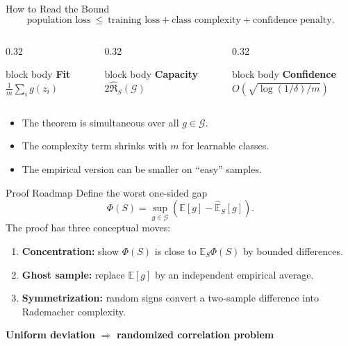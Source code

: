 \documentclass[aspectratio=169,10pt]{beamer}
\newcommand{\Gc}{\mathcal{G}}
\newcommand{\RadS}{\widehat{\mathfrak{R}}_S}
\newcommand{\E}{\mathbb{E}}
\newcommand{\KeyBox}[1]{%
  \begin{beamercolorbox}[rounded=true,sep=0.22cm,wd=\linewidth]{block body}
    #1
  \end{beamercolorbox}%
}
\begin{document}
\begin{frame}[t]{How to Read the Bound}
  \vspace{0.10cm}
  \[
    \text{population loss}
    \ \le\ \text{training loss}
    +\text{class complexity}
    +\text{confidence penalty}.
  \]
  \vspace{0.10cm}
  \begin{columns}[T,totalwidth=\textwidth]
    \begin{column}{0.32\textwidth}
      \KeyBox{\centering\textbf{Fit}\\$\frac1m\sum_i g(z_i)$}
    \end{column}
    \begin{column}{0.32\textwidth}
      \KeyBox{\centering\textbf{Capacity}\\$2\RadS(\Gc)$}
    \end{column}
    \begin{column}{0.32\textwidth}
      \KeyBox{\centering\textbf{Confidence}\\$O(\sqrt{\log(1/\delta)/m})$}
    \end{column}
  \end{columns}
  \vspace{0.18cm}
  \begin{itemize}
    \setlength{\itemsep}{0.09cm}
    \item The theorem is simultaneous over all $g\in\Gc$.
    \item The complexity term shrinks with $m$ for learnable classes.
    \item The empirical version can be smaller on ``easy'' samples.
  \end{itemize}
\end{frame}

\begin{frame}[t]{Proof Roadmap}
  \vspace{0.05cm}
  Define the worst one-sided gap
  \[
    \Phi(S)=\sup_{g\in\Gc}\left(\E[g]-\widehat{\E}_S[g]\right).
  \]
  The proof has three conceptual moves:
  \vspace{0.04cm}
  \begin{enumerate}
    \setlength{\itemsep}{0.15cm}
    \item \textbf{Concentration:} show $\Phi(S)$ is close to $\E_S\Phi(S)$ by bounded differences.
    \item \textbf{Ghost sample:} replace $\E[g]$ by an independent empirical average.
    \item \textbf{Symmetrization:} random signs convert a two-sample difference into Rademacher complexity.
  \end{enumerate}
  \vspace{0.10cm}
  \centering
  \textbf{Uniform deviation} $\Rightarrow$ \textbf{randomized correlation problem}
\end{frame}
\end{document}
